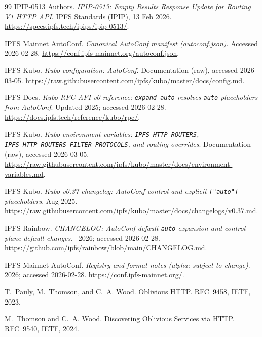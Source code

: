 \documentclass[11pt]{article}
\begin{document}
\begin{thebibliography}{99}
IPIP-0513 Authors.
\newblock \emph{IPIP-0513: Empty Results Response Update for Routing V1 HTTP API}.
\newblock IPFS Standards (IPIP), 13 Feb 2026.
\newblock \url{https://specs.ipfs.tech/ipips/ipip-0513/}.


IPFS Mainnet AutoConf.
\newblock \emph{Canonical AutoConf manifest (autoconf.json)}.
\newblock Accessed 2026-02-28.
\newblock \url{https://conf.ipfs-mainnet.org/autoconf.json}.

IPFS Kubo.
\newblock \emph{Kubo configuration: AutoConf}.
\newblock Documentation (raw), accessed 2026-03-05.
\newblock \url{https://raw.githubusercontent.com/ipfs/kubo/master/docs/config.md}.


IPFS Docs.
\newblock \emph{Kubo RPC API v0 reference: \texttt{expand-auto} resolves \texttt{auto} placeholders from AutoConf}.
\newblock Updated 2025; accessed 2026-02-28.
\newblock \url{https://docs.ipfs.tech/reference/kubo/rpc/}.


IPFS Kubo.
\newblock \emph{Kubo environment variables: \texttt{IPFS\_HTTP\_ROUTERS}, \texttt{IPFS\_HTTP\_ROUTERS\_\allowbreak FILTER\_\allowbreak PROTOCOLS}, and routing overrides}.
\newblock Documentation (raw), accessed 2026-03-05.
\newblock \url{https://raw.githubusercontent.com/ipfs/kubo/master/docs/environment-variables.md}.


IPFS Kubo.
\newblock \emph{Kubo v0.37 changelog: AutoConf control and explicit \texttt{["auto"]} placeholders}.
 Aug 2025.
\newblock \url{https://raw.githubusercontent.com/ipfs/kubo/master/docs/changelogs/v0.37.md}.

IPFS Rainbow.
\newblock \emph{CHANGELOG: AutoConf default \texttt{auto} expansion and control-plane default changes}.
--2026; accessed 2026-02-28.
\newblock \url{https://github.com/ipfs/rainbow/blob/main/CHANGELOG.md}.


IPFS Mainnet AutoConf.
\newblock \emph{Registry and format notes (alpha; subject to change)}.
--2026; accessed 2026-02-28.
\newblock \url{https://conf.ipfs-mainnet.org/}.


T.~Pauly, M.~Thomson, and C.~A. Wood.
\newblock Oblivious HTTP.
\newblock RFC~9458, IETF, 2023.

M.~Thomson and C.~A. Wood.
\newblock Discovering Oblivious Services via HTTP.
\newblock RFC~9540, IETF, 2024.


\end{thebibliography}
\end{document}
